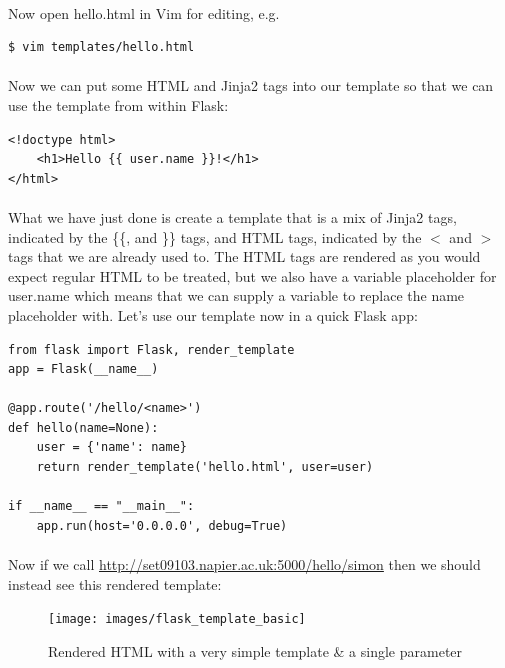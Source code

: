 \documentclass[12pt, a4paper, oneside]{book}
\begin{document}
\paragraph{} Now open hello.html in Vim for editing, e.g.
\begin{lstlisting}[style=DOS]
$ vim templates/hello.html
\end{lstlisting}

\paragraph{} Now we can put some HTML and Jinja2 tags into our template so that we can use the template from within Flask:


\begin{lstlisting}
<!doctype html>
    <h1>Hello {{ user.name }}!</h1>
</html>
\end{lstlisting}

\paragraph{} What we have just done is create a template that is a mix of Jinja2 tags, indicated by the \{\{, and \}\} tags, and HTML tags, indicated by the $<$ and $>$ tags that we are already used to. The HTML tags are rendered as you would expect regular HTML to be treated, but we also have a variable placeholder for user.name which means that we can supply a variable to replace the name placeholder with. Let's use our template now in a quick Flask app:

\begin{lstlisting}
from flask import Flask, render_template
app = Flask(__name__)

@app.route('/hello/<name>')
def hello(name=None):
    user = {'name': name}
    return render_template('hello.html', user=user)

if __name__ == "__main__":
    app.run(host='0.0.0.0', debug=True)
\end{lstlisting}

\paragraph{} Now if we call \url{http://set09103.napier.ac.uk:5000/hello/simon} then we should instead see this rendered template:

\begin{figure}[H]
\centering
\texttt{[image: images/flask\_template\_basic]}
\caption{Rendered HTML with a very simple template \& a single parameter}
\label{fig:flask_template_basic}
\end{figure}
\end{document}
